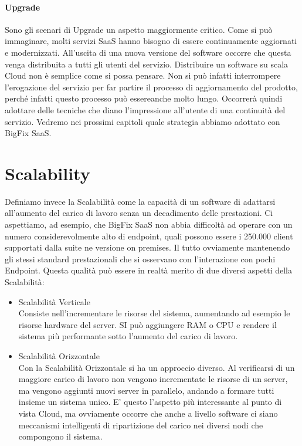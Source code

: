 \paragraph{Upgrade}
Sono gli scenari di Upgrade un aspetto maggiormente critico. Come si può immaginare, molti servizi SaaS hanno bisogno di essere continuamente aggiornati e modernizzati. All'uscita di una nuova versione del software occorre che questa venga distribuita a tutti gli utenti del servizio. Distribuire un software su scala Cloud non è semplice come si possa pensare. Non si può infatti interrompere l'erogazione del servizio per far partire il processo di aggiornamento del prodotto, perché infatti questo processo può essereanche molto lungo. Occorrerà quindi adottare delle tecniche che diano l'impressione all'utente di una continuità del servizio. Vedremo nei prossimi capitoli quale strategia abbiamo adottato con BigFix SaaS. 

\section{Scalability}
Definiamo invece la Scalabilità come la capacità di un software di adattarsi all'aumento del carico di lavoro senza un decadimento delle prestazioni. Ci aspettiamo, ad esempio, che BigFix SaaS non abbia difficoltà ad operare con un numero considerevolmente alto di endpoint, quali possono essere i 250.000 client supportati dalla suite ne versione on premises. Il tutto ovviamente mantenendo gli stessi standard prestazionali che si osservano con l'interazione con pochi Endpoint. Questa qualità può essere in realtà merito di due diversi aspetti della Scalabilità:
\begin{itemize}
	\item  Scalabilità Verticale \\
	Consiste nell'incrementare le risorse del sistema, aumentando ad esempio le risorse hardware del server. SI può aggiungere RAM o CPU e rendere il sistema più performante sotto l'aumento del carico di lavoro.
	
	\item  Scalabilità Orizzontale \\
	Con la Scalabilità Orizzontale si ha un approccio diverso. Al verificarsi di un maggiore carico di lavoro non vengono incrementate le risorse di un server, ma vengono aggiunti nuovi server in parallelo, andando a formare tutti insieme un sistema unico. E' questo l'aspetto più interessante al punto di vista Cloud, ma ovviamente occorre che anche a livello software ci siano meccanismi intelligenti di ripartizione del carico nei diversi nodi che  compongono il sistema.
\end{itemize}


